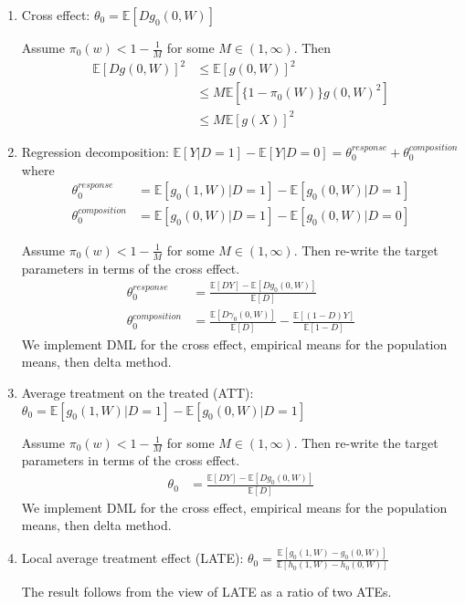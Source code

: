 \begin{enumerate}
    Denote the density of $t(X)$ by $f_t(x)$. Assume $\frac{f_t(x)}{f(x)}\leq M$ for $M\in[0,\infty)$. Then
    \begin{align}
        \mathbb{E}[g(t(X))-g(X)]^2 
        &\leq 2\mathbb{E}[g(t(X))^2+g(X)^2] \\
        &= 2\mathbb{E}\left[g(X)^2\left\{\frac{f_t(X)}{f(X)}-1\right\}\right] \\
        &\leq 2 (M+1) \mathbb{E}[g(X)]^2
    \end{align}
    \item Cross effect: $\theta_0=\mathbb{E}[Dg_0(0,W)]$
    
    Assume $\pi_0(w)<1-\frac{1}{M}$ for some $M\in(1,\infty)$. Then
    \begin{align}
        \mathbb{E}[Dg(0,W)]^2&\leq \mathbb{E}[g(0,W)]^2 \\
        &\leq M \mathbb{E}[\{1-\pi_0(W)\}g(0,W)^2] \\
        &\leq M \mathbb{E}[g(X)]^2
    \end{align}
    
    \item Regression decomposition: $\mathbb{E}[Y|D=1]-\mathbb{E}[Y|D=0]=\theta_0^{response}+\theta_0^{composition}$
    where
    \begin{align}
        \theta_0^{response}&=\mathbb{E}[g_0(1,W)|D=1]-\mathbb{E}[g_0(0,W)|D=1] \\
        \theta_0^{composition}&=\mathbb{E}[g_0(0,W)|D=1]-\mathbb{E}[g_0(0,W)|D=0]
    \end{align}
    
    Assume $\pi_0(w)<1-\frac{1}{M}$ for some $M\in(1,\infty)$. Then re-write the target parameters in terms of the cross effect.
      \begin{align}
        \theta_0^{response}&=\frac{\mathbb{E}[DY]-\mathbb{E}[Dg_0(0,W)]}{\mathbb{E}[D]} \\
        \theta_0^{composition}&=
        \frac{\mathbb{E}[D\gamma_0(0,W)]}{\mathbb{E}[D]}-\frac{\mathbb{E}[(1-D)Y]}{\mathbb{E}[1-D]}
    \end{align}
    We implement DML for the cross effect, empirical means for the population means, then delta method.
    
    \item Average treatment on the treated (ATT): $\theta_0=\mathbb{E}[g_0(1,W)|D=1]-\mathbb{E}[g_0(0,W)|D=1]$
    
    Assume $\pi_0(w)<1-\frac{1}{M}$ for some $M\in(1,\infty)$. Then re-write the target parameters in terms of the cross effect.
      \begin{align}
        \theta_0&=\frac{\mathbb{E}[DY]-\mathbb{E}[Dg_0(0,W)]}{\mathbb{E}[D]}
    \end{align}
    We implement DML for the cross effect, empirical means for the population means, then delta method.
    
    \item Local average treatment effect (LATE): $\theta_0=\frac{\mathbb{E}[g_0(1,W)-g_0(0,W)]}{\mathbb{E}[h_0(1,W)-h_0(0,W)]}$
    
    The result follows from the view of LATE as a ratio of two ATEs.
\end{enumerate}

